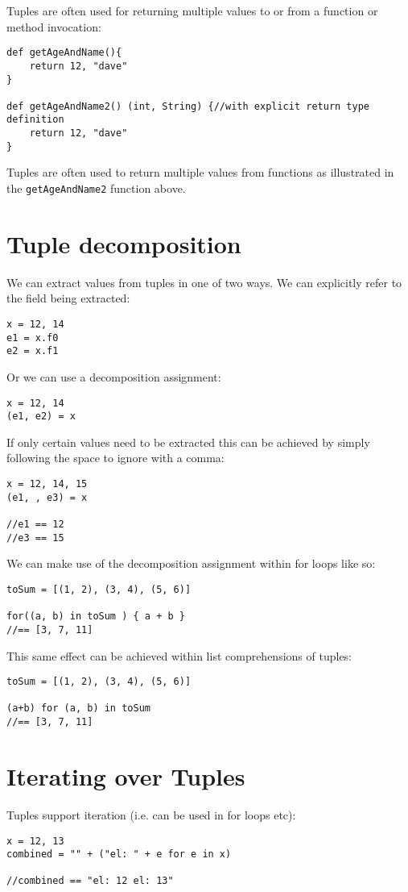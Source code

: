 \documentclass[conc-doc]{subfiles}
\begin{document}
Tuples are often used for returning multiple values to or from a function or method invocation:
\begin{lstlisting}
def getAgeAndName(){
	return 12, "dave"
}

def getAgeAndName2() (int, String) {//with explicit return type definition
	return 12, "dave"
}
\end{lstlisting}

Tuples are often used to return multiple values from functions as illustrated in the \lstinline{getAgeAndName2} function above.

\section{Tuple decomposition}
We can extract values from tuples in one of two ways. We can explicitly refer to the field being extracted:
\begin{lstlisting}
x = 12, 14
e1 = x.f0
e2 = x.f1
\end{lstlisting}

Or we can use a decomposition assignment:
\begin{lstlisting}
x = 12, 14
(e1, e2) = x
\end{lstlisting}

If only certain values need to be extracted this can be achieved by simply following the space to ignore with a comma:
\begin{lstlisting}
x = 12, 14, 15
(e1, , e3) = x

//e1 == 12
//e3 == 15
\end{lstlisting}

We can make use of the decomposition assignment within for loops like so:
\begin{lstlisting}
toSum = [(1, 2), (3, 4), (5, 6)]

for((a, b) in toSum ) { a + b }
//== [3, 7, 11]
\end{lstlisting}

This same effect can be achieved within list comprehensions of tuples:

\begin{lstlisting}
toSum = [(1, 2), (3, 4), (5, 6)]

(a+b) for (a, b) in toSum 
//== [3, 7, 11]
\end{lstlisting}

\section{Iterating over Tuples}
Tuples support iteration (i.e. can be used in for loops etc):
\begin{lstlisting}
x = 12, 13
combined = "" + ("el: " + e for e in x)

//combined == "el: 12 el: 13"
\end{lstlisting}
\end{document}
